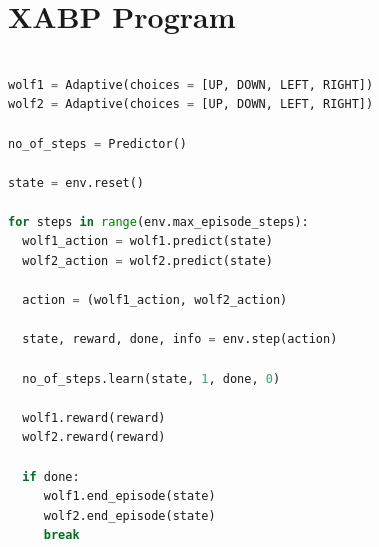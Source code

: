\documentclass[conference]{IEEEtran}
\begin{document}

\section{XABP Program}


\begin{lstlisting}[language = Python,
                   label = {lst:abp_wolf_hunt},
                   caption = {Adaptive Program for wolf hunt problem},
                   captionpos = b]

wolf1 = Adaptive(choices = [UP, DOWN, LEFT, RIGHT])
wolf2 = Adaptive(choices = [UP, DOWN, LEFT, RIGHT])

no_of_steps = Predictor()

state = env.reset()

for steps in range(env.max_episode_steps):
  wolf1_action = wolf1.predict(state)
  wolf2_action = wolf2.predict(state)

  action = (wolf1_action, wolf2_action)

  state, reward, done, info = env.step(action)

  no_of_steps.learn(state, 1, done, 0)

  wolf1.reward(reward)
  wolf2.reward(reward)

  if done:
     wolf1.end_episode(state)
     wolf2.end_episode(state)
     break

\end{lstlisting}


%
%
\end{document}
